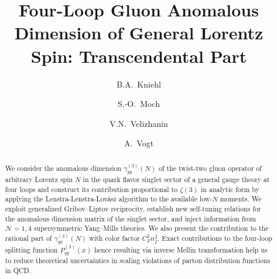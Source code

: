 \documentclass[
 twocolumn,
 superscriptaddress,
 preprintnumbers,
 nofootinbib,
 amsmath,amssymb,
 aps,
 prl
 ]{revtex4-2}
\begin{document}

\title{Four-Loop Gluon Anomalous Dimension of General Lorentz Spin: Transcendental Part}

\author{B.A.~Kniehl}
\author{S.-O.~Moch}
\author{V.N.~Velizhanin}
\author{A.~Vogt}




\begin{abstract}
  We consider the anomalous dimension $\gamma_{gg}^{(3)}(N)$ of the twist-two gluon operator of arbitrary Lorentz spin $N$ in the quark flavor singlet sector of a general gauge theory at four loops and construct its contribution proportional to $\zeta(3)$ in analytic form by applying the Lenstra-Lenstra-Lov\'{a}sz algorithm to the available low-$N$ moments.
We exploit generalized Gribov--Liptov reciprocity, establish new self-tuning relations for the anomalous dimension matrix of the singlet sector, and inject information from $\mathcal{N}=1,4$ supersymmetric Yang--Mills theories.
We also present the contribution to the rational part of $\gamma_{gg}^{(3)}(N)$ with color factor $C_F^2n_f^2$.
Exact contributions to the four-loop splitting function $P_{gg}^{(3)}(x)$ hence resulting via inverse Mellin transformation help us to reduce theoretical uncertainties in scaling violations of parton distribution functions in QCD.
\end{abstract}


\pacs{}


\maketitle
\end{document}
